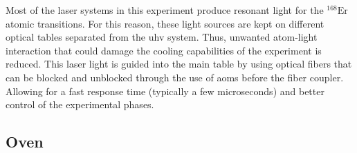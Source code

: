 Most of the laser systems in this experiment produce resonant light for the $^{\text{168}}\text{Er}$ atomic transitions. For this reason, these light sources are kept on different optical tables separated from the \ac{uhv} system. Thus, unwanted atom-light interaction that could damage the cooling capabilities of the experiment is reduced. This laser light is guided into the main table by using optical fibers that can be blocked and unblocked through the use of \acp{aom} before the fiber coupler. Allowing for a fast response time (typically a few microseconds) and better control of the experimental phases.

\subsection{Oven}





